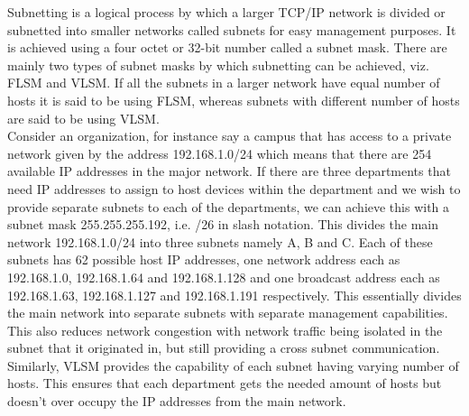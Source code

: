 \documentclass{lab_sheet}
\begin{document}
    Subnetting is a logical process by which a larger TCP/IP network is divided or subnetted into smaller networks called subnets for easy management purposes. It is achieved using a four octet or 32-bit number called a subnet mask.
    There are mainly two types of subnet masks by which subnetting can be achieved, viz. FLSM and VLSM. If all the subnets in a larger network have equal number of hosts it is said to be using FLSM, whereas subnets with different number of hosts are said to be using VLSM.
    \\[\baselineskip]
     Consider an organization, for instance say a campus that has access to a private network given by the address 192.168.1.0/24 which means that there are 254 available IP addresses in the major network. If there are three departments that need IP addresses to assign to host devices within the department and we wish to provide separate subnets to each of the departments, we can achieve this with a subnet mask 255.255.255.192, i.e. /26 in slash notation. This divides the main network 192.168.1.0/24 into three subnets namely A, B and C. Each of these subnets has 62 possible host IP addresses, one network address each as 192.168.1.0, 192.168.1.64 and 192.168.1.128 and one broadcast address each as 192.168.1.63, 192.168.1.127 and 192.168.1.191 respectively. This essentially divides the main network into separate subnets with separate management capabilities. This also reduces network congestion with network traffic being isolated in the subnet that it originated in, but still providing a cross subnet communication. \\[\baselineskip]
     Similarly, VLSM provides the capability of each subnet having varying number of hosts. This ensures that each department gets the needed amount of hosts but doesn't over occupy the IP addresses from the main network.
\end{document}

